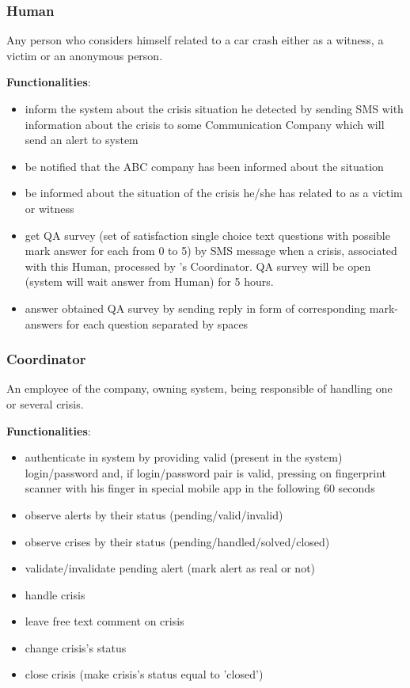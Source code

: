 \subsubsection{Human}
Any person who considers himself related to a car crash either as a
witness, a victim or an anonymous person. 

\textbf{Functionalities}:

\begin{itemize}
  \item inform the \mysystemname system about the crisis situation he detected
  by sending SMS with information about the crisis to some Communication Company
  which will send an alert to \mysystemname system
  \item be notified that the ABC company has been informed about the situation
  \item be informed about the situation of the crisis he/she has related to as a
  victim or witness
  \item get QA survey (set of satisfaction single choice text questions with
  possible mark answer for each from 0 to 5) by SMS message when a crisis,
  associated with this Human, processed by \mysystemname's Coordinator. QA
  survey will be open (\mysystemname system will wait answer from Human) for 5
  hours.
  \item answer obtained QA survey by sending reply in form of corresponding
  mark-answers for each question separated by spaces
\end{itemize}

\subsubsection{Coordinator}
An employee of the company, owning \mysystemname system, being responsible of
handling one or several crisis.

\textbf{Functionalities}:

\begin{itemize}
  \item authenticate in \mysystemname system by providing valid (present in the
  system) login/password and, if login/password pair is valid, pressing on
  fingerprint scanner with his finger in special mobile app in the following 60
  seconds
  \item observe alerts by their status (pending/valid/invalid)
  \item observe crises by their status (pending/handled/solved/closed)
  \item validate/invalidate pending alert (mark alert as real or not)
  \item handle crisis
  \item leave free text comment on crisis
  \item change crisis's status
  \item close crisis (make crisis's status equal to 'closed')
\end{itemize}

